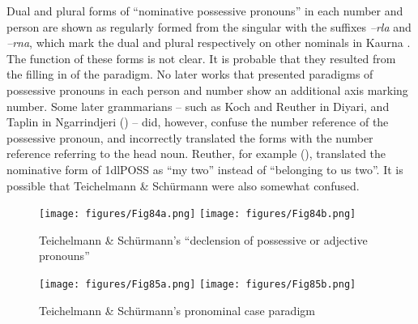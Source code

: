 Dual and plural forms of “nominative possessive pronouns” in each number and person are shown as regularly formed from the singular with the suffixes \textit{–rla} and \textit{–rna}, which mark the dual and plural respectively on other nominals in Kaurna \citep[123]{amery_kulurdu_2013}. The function of these forms is not clear. It is probable that they resulted from the filling in of the paradigm. No later works that presented paradigms of possessive pronouns in each person and number show an additional axis marking number. Some later grammarians -- such as Koch and Reuther in Diyari, and Taplin in Ngarrindjeri () -- did, however, confuse the number reference of the possessive pronoun, and incorrectly translated the forms with the number reference referring to the head noun. Reuther, for example (), translated the nominative form of 1dlPOSS as “my two” instead of “belonging to us two”. It is possible that Teichelmann \& Schürmann were also somewhat confused.
 
 
\begin{figure}
\texttt{[image: figures/Fig84a.png]}
\texttt{[image: figures/Fig84b.png]}
\caption{\label{fig:5:84}Teichelmann \& Schürmann’s “declension of possessive or adjective pronouns” \citeyearpar[11-12]{teichelmann_outlines_1840}}
\end{figure}

 
 
\begin{figure}
\texttt{[image: figures/Fig85a.png]}
\texttt{[image: figures/Fig85b.png]}
\caption{\label{fig:5:85}Teichelmann \& Schürmann’s pronominal case paradigm \citeyearpar[7-8]{teichelmann_outlines_1840}}
\end{figure}


